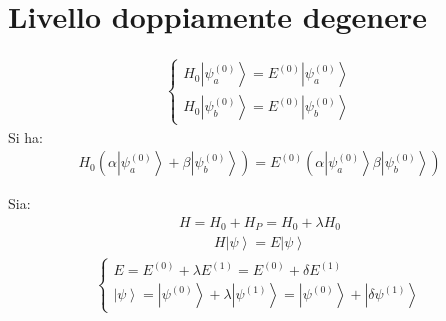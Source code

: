 \section{Livello doppiamente degenere} %
\begin{equation}\begin{split}
\begin{cases}
H_0\left |\psi _a^{\left(0\right)} \right\rangle=E^{\left(0\right)}\left |\psi _a^{\left(0\right)} \right\rangle \\
H_0\left |\psi _b^{\left(0\right)} \right\rangle=E^{\left(0\right)}\left |\psi _b^{\left(0\right)} \right\rangle
\end{cases}
\end{split}\end{equation}
Si ha:
\begin{equation}\begin{split}
H_0\left(\alpha\left |\psi _a ^{\left(0\right)}\right\rangle+\beta\left |\psi _b^{\left(0\right)} \right\rangle\right)=E^{\left(0\right)}\left(\alpha\left |\psi _a ^{\left(0\right)}\right\rangle\beta\left |\psi _b^{\left(0\right)} \right\rangle\right)
\end{split}\end{equation}

Sia:
\begin{equation}\begin{split}
H=H_0+H_P=H_0+\lambda H_0
\end{split}\end{equation}
\begin{equation}\begin{split}
H\left |\psi  \right\rangle=E\left |\psi  \right\rangle
\end{split}\end{equation}
\begin{equation}\begin{split}
\begin{cases}
E=E^{\left(0\right)}+\lambda E^{\left(1\right)}=E^{\left(0\right)}+\delta E^{\left(1\right)} \\
\left |\psi  \right\rangle=\left |\psi ^{\left(0\right)} \right\rangle+\lambda\left |\psi ^{\left(1\right)} \right\rangle=\left |\psi ^{\left(0\right)} \right\rangle+\left |\delta\psi ^{\left(1\right)} \right\rangle
\end{cases}
\end{split}\end{equation}

